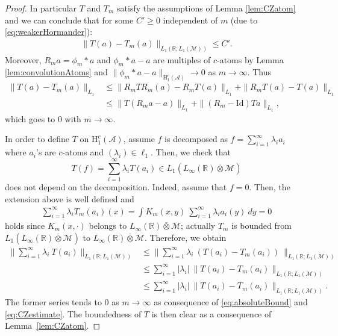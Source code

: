 \documentclass[psamsfonts]{amsart}
\newcommand{\Lone}{L_1}
\newcommand{\Linfty}{L_\infty}
\newcommand{\Honec}{\mathrm{H}_1^c}
\newcommand{\Hardyc}{\Honec(\mathcal{A})}
\newcommand{\id}{\mathrm{Id}}
\newcommand{\Avnat}{\Linfty(\mathbb{R}) \overline{\otimes} \mathcal{M}}
\begin{document}
\begin{proof}
In particular $T$ and $T_m$ satisfy the assumptions of Lemma \ref{lem:CZatom} and we can conclude that for some $C' \geq 0$ independent of $m$ (due to \eqref{eq:weakerHormander}):
        \begin{align}\label{eq:absoluteBound}
            \|T(a)-T_m(a)\|_{\Lone(\mathbb{R};\Lone(\mathcal{M}))} \leq  C'.
        \end{align}
  Moreover, $R_m a = \phi_m * a$ and $\phi_m*a-a$ are multiples of  $c$-atoms by Lemma \ref{lem:convolutionAtoms} and  $\|\phi_m*a-a\|_{\Hardyc}\to 0$ as $m\to \infty$. Thus
        \begin{align} \nonumber
            \|T(a)-T_m(a)\|_{\Lone} &\leq \|R_m T R_m(a)-R_m T (a)\|_{\Lone} + \|R_m T(a) - T(a)\|_{\Lone} \\  \label{eq:CZestimate}
            &\leq \|T(R_m a - a)\|_{\Lone} + \|(R_m - \id)Ta\|_{\Lone},
        \end{align}
        which goes to $0$ with $m\to \infty$.

        
        In order to define $T$ on $\Hardyc$, assume $f$ is decomposed as
        $f=\sum_{i=1}^\infty \lambda_i a_i$ where $a_i$'s are
        $c$-atoms and $(\lambda_i)\in \ell_1$. Then, we check that
    $$T(f)=\sum_{i=1}^\infty\lambda_i T(a_i)\in \Lone(\Linfty(\mathbb{R}) \overline{\otimes} \mathcal{M})$$
    does not depend on the decomposition. Indeed, assume that $f=0$. Then, the extension above is well defined and
        \begin{align*}
            \sum_{i=1}^\infty \lambda_i T_m(a_i)(x) = \int K_m(x,y) \ \sum_{i=1}^\infty \lambda_i a_i(y) \ dy = 0
        \end{align*}
    holds since $K_m(x,\cdot)$ belongs to
    $\Avnat$; actually $T_m$ is bounded from $\Lone(\Linfty(\mathbb{R}) \overline{\otimes} \mathcal{M})$ to $\Linfty(\mathbb{R}) \overline{\otimes} \mathcal{M}$. Therefore, we obtain
        \begin{align*}
            \Big\| \sum_{i=1}^\infty \lambda_i \ T(a_i)\Big\|_{\Lone(\mathbb{R};\Lone(\mathcal{M}))} 
            &\leq  \Big\| \sum_{i=1}^\infty \lambda_i \ (T(a_i) -T_m(a_i)) \ \Big\|_{\Lone(\mathbb{R};\Lone(\mathcal{M}))} \\
            &\leq \sum_{i=1}^\infty |\lambda_i| \ \|T(a_i) - T_m(a_i)\|_{\Lone(\mathbb{R};\Lone(\mathcal{M}))} \\
            &\leq \sum_{i=1}^\infty |\lambda_i| \ \|T(a_i) - T_m(a_i)\|_{\Lone(\mathbb{R};\Lone(\mathcal{M}))}.
        \end{align*}
        The former series tends to $0$ as $m\to \infty$ as consequence of \eqref{eq:absoluteBound} and \eqref{eq:CZestimate}. The boundedness of $T$ is then clear as a consequence of Lemma~\ref{lem:CZatom}.
    \end{proof}
\end{document}

